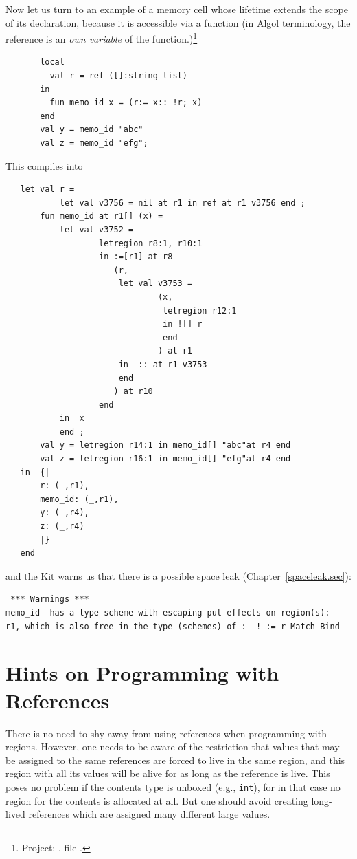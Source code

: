 \documentclass[12pt]{book}
\begin{document}
Now let us turn to an example of a memory cell whose lifetime
extends the scope of its declaration, because it is
accessible via a function (in Algol terminology,
the reference is an {\em own variable} of the function.)\footnote{Project:
, file .}
\begin{verbatim}
       local
         val r = ref ([]:string list)
       in
         fun memo_id x = (r:= x:: !r; x)
       end
       val y = memo_id "abc"
       val z = memo_id "efg";
\end{verbatim}
This compiles into
\begin{verbatim}
   let val r = 
           let val v3756 = nil at r1 in ref at r1 v3756 end ; 
       fun memo_id at r1[] (x) = 
           let val v3752 = 
                   letregion r8:1, r10:1 
                   in :=[r1] at r8 
                      (r, 
                       let val v3753 = 
                               (x, 
                                letregion r12:1 
                                in ![] r 
                                end
                               ) at r1
                       in  :: at r1 v3753
                       end 
                      ) at r10 
                   end
           in  x
           end ; 
       val y = letregion r14:1 in memo_id[] "abc"at r4 end 
       val z = letregion r16:1 in memo_id[] "efg"at r4 end 
   in  {|
       r: (_,r1), 
       memo_id: (_,r1), 
       y: (_,r4), 
       z: (_,r4)
       |}
   end 
\end{verbatim}
and the Kit warns us that there is a possible space leak (Chapter~\ref{spaceleak.sec}):
{\small
\begin{verbatim}
 *** Warnings ***
memo_id  has a type scheme with escaping put effects on region(s): 
r1, which is also free in the type (schemes) of :  ! := r Match Bind
\end{verbatim}
}
%
\section{Hints on Programming  with References}
There is no need to shy away from using references when programming
with regions. However, one needs to be aware of the restriction that
values that may be assigned to the same references are forced to live
in the same region, and this region with all its values will be alive
for as long as the reference is live. This poses no problem if the
contents type is unboxed (e.g., {\tt int}), for in that case no region
for the contents is allocated at all. But one should avoid creating
long-lived references which are assigned many different large values.
\end{document}
